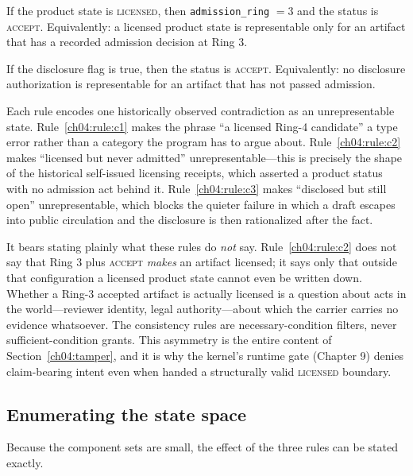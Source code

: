 \begin{ruleenv}\label{ch04:rule:c2}
If the product state is \textsc{licensed}, then \texttt{admission\_ring}
$=3$ and the status is \textsc{accept}. Equivalently: a licensed product
state is representable only for an artifact that has a recorded admission
decision at Ring 3.
\end{ruleenv}

\begin{ruleenv}\label{ch04:rule:c3}
If the disclosure flag is true, then the status is \textsc{accept}.
Equivalently: no disclosure authorization is representable for an artifact
that has not passed admission.
\end{ruleenv}

Each rule encodes one historically observed contradiction as an
unrepresentable state. Rule~\ref{ch04:rule:c1} makes the phrase ``a licensed
Ring-4 candidate'' a type error rather than a category the program has to
argue about. Rule~\ref{ch04:rule:c2} makes ``licensed but never admitted''
unrepresentable---this is precisely the shape of the historical self-issued
licensing receipts, which asserted a product status with no admission act
behind it. Rule~\ref{ch04:rule:c3} makes ``disclosed but still open''
unrepresentable, which blocks the quieter failure in which a draft escapes
into public circulation and the disclosure is then rationalized after the
fact.

It bears stating plainly what these rules do \emph{not} say.
Rule~\ref{ch04:rule:c2} does not say that Ring 3 plus \textsc{accept}
\emph{makes} an artifact licensed; it says only that outside that
configuration a licensed product state cannot even be written down. Whether
a Ring-3 accepted artifact is actually licensed is a question about acts in
the world---reviewer identity, legal authority---about which the carrier
carries no evidence whatsoever. The consistency rules are necessary-condition
filters, never sufficient-condition grants. This asymmetry is the entire
content of Section~\ref{ch04:tamper}, and it is why the kernel's runtime
gate (Chapter 9) denies claim-bearing intent even when handed a
structurally valid \textsc{licensed} boundary.

\subsection{Enumerating the state space}

Because the component sets are small, the effect of the three rules can be
stated exactly.

